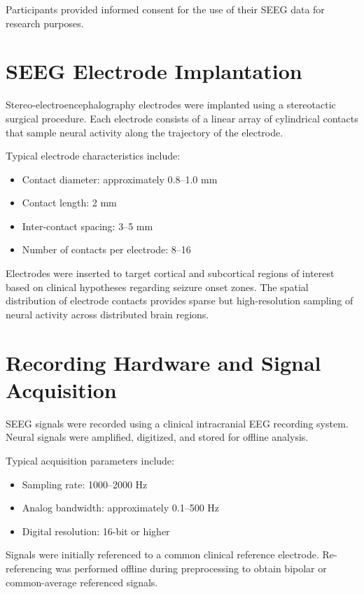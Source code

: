 \documentclass[11pt]{report}
\begin{document}
Participants provided informed consent for the use of their SEEG data
for research purposes.

\section{SEEG Electrode Implantation}

Stereo-electroencephalography electrodes were implanted using a
stereotactic surgical procedure. Each electrode consists of a linear
array of cylindrical contacts that sample neural activity along the
trajectory of the electrode.

Typical electrode characteristics include:

\begin{itemize}
\item Contact diameter: approximately 0.8--1.0 mm
\item Contact length: 2 mm
\item Inter-contact spacing: 3--5 mm
\item Number of contacts per electrode: 8--16
\end{itemize}

Electrodes were inserted to target cortical and subcortical regions
of interest based on clinical hypotheses regarding seizure onset zones.
The spatial distribution of electrode contacts provides sparse but
high-resolution sampling of neural activity across distributed brain
regions.

\section{Recording Hardware and Signal Acquisition}

SEEG signals were recorded using a clinical intracranial EEG
recording system. Neural signals were amplified, digitized, and stored
for offline analysis.

Typical acquisition parameters include:

\begin{itemize}
\item Sampling rate: 1000--2000 Hz
\item Analog bandwidth: approximately 0.1--500 Hz
\item Digital resolution: 16-bit or higher
\end{itemize}

Signals were initially referenced to a common clinical reference
electrode. Re-referencing was performed offline during preprocessing
to obtain bipolar or common-average referenced signals.
\end{document}
